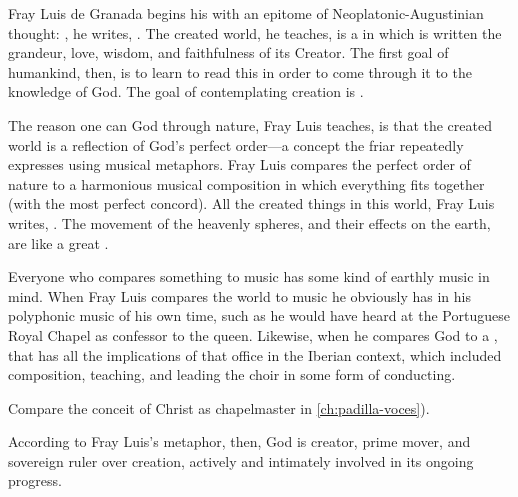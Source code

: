 Fray Luis de Granada begins his  with an
epitome of Neoplatonic-Augustinian thought: , he writes, .%
    \Autocite[182]{LuisdeGranada:Simbolo}
The created world, he teaches, is a  in which is written
the grandeur, love, wisdom, and faithfulness of its Creator.
The first goal of humankind, then, is to learn to read this  in order to come through it to the knowledge of God. 
The goal of contemplating creation is .%
    \Autocite[184]{LuisdeGranada:Simbolo}

The reason one can  God through nature, Fray Luis teaches, is that
the created world is a reflection of God's perfect order---a concept the friar
repeatedly expresses using musical metaphors.
Fray Luis compares the perfect order of nature to a harmonious musical
composition in which everything fits together 
(with the most perfect concord).
All the created things in this world, Fray Luis writes, .%
    \Autocite[191]{LuisdeGranada:Simbolo}
The movement of the heavenly spheres, and their effects on the earth, are like
a great .%
    \Autocite[191]{LuisdeGranada:Simbolo}

Everyone who compares something to music has some kind of earthly music in
mind.
When Fray Luis compares the world to music  he
obviously has in his  polyphonic music of his own time, such
as he would have heard at the Portuguese Royal Chapel as confessor to the
queen.
Likewise, when he compares God to a , that has all
the implications of that office in the Iberian context, which included
composition, teaching, and leading the choir in some form of conducting.%
\begin{Footnote}
    Compare the conceit of Christ as chapelmaster in \cref{ch:padilla-voces}).
\end{Footnote}
According to Fray Luis's metaphor, then, God is creator, prime mover, and
sovereign ruler over creation, actively and intimately involved in its ongoing
progress.

